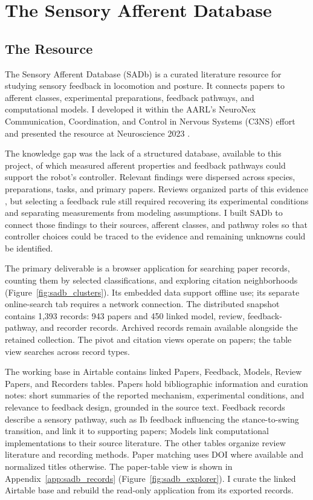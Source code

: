 \chapter{The Sensory Afferent Database}\label{ch:database}
\graphicspath{{figs/50-database/}}

\section{The Resource}\label{sec:sadb_resource}

The Sensory Afferent Database (SADb) is a curated literature resource for studying sensory feedback in locomotion and posture. It connects papers to afferent classes, experimental preparations, feedback pathways, and computational models. I developed it within the AARL's NeuroNex Communication, Coordination, and Control in Nervous Systems (C3NS) effort and presented the resource at Neuroscience 2023 \citep{bolen_sensory_2023}.

The knowledge gap was the lack of a structured database, available to this project, of which measured afferent properties and feedback pathways could support the robot's controller. Relevant findings were dispersed across species, preparations, tasks, and primary papers. Reviews organized parts of this evidence \citep{van_de_crommert_review_1998, windhorst_muscle_2007, windhorst_spinal_2022}, but selecting a feedback rule still required recovering its experimental conditions and separating measurements from modeling assumptions. I built SADb to connect those findings to their sources, afferent classes, and pathway roles so that controller choices could be traced to the evidence and remaining unknowns could be identified.

The primary deliverable is a browser application for searching paper records, counting them by selected classifications, and exploring citation neighborhoods (Figure~\ref{fig:sadb_clusters}). Its embedded data support offline use; its separate online-search tab requires a network connection. The distributed snapshot contains 1,393 records: 943 papers and 450 linked model, review, feedback-pathway, and recorder records. Archived records remain available alongside the retained collection. The pivot and citation views operate on papers; the table view searches across record types.

The working base in Airtable contains linked Papers, Feedback, Models, Review Papers, and Recorders tables. Papers hold bibliographic information and curation notes: short summaries of the reported mechanism, experimental conditions, and relevance to feedback design, grounded in the source text. Feedback records describe a sensory pathway, such as Ib feedback influencing the stance-to-swing transition, and link it to supporting papers; Models link computational implementations to their source literature. The other tables organize review literature and recording methods. Paper matching uses DOI where available and normalized titles otherwise. The paper-table view is shown in Appendix~\ref{app:sadb_records} (Figure~\ref{fig:sadb_explorer}). I curate the linked Airtable base and rebuild the read-only application from its exported records.

